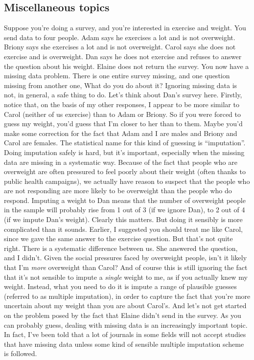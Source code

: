\subsection{Miscellaneous topics}

\begin{itemize}
 Suppose you're doing a survey, and you're interested in exercise and weight. You send data to four people. Adam says he exercises a lot and is not overweight. Briony says she exercises a lot and is not overweight. Carol says she does not exercise and is overweight. Dan says he does not exercise and refuses to answer the question about his weight. Elaine does not return the survey. You now have a missing data problem. There is one entire survey missing, and one question missing from another one, What do you do about it? Ignoring missing data is not, in general, a safe thing to do. Let's think about Dan's survey here. Firstly, notice that, on the basis of my other responses, I appear to be more similar to Carol (neither of us exercise) than to Adam or Briony. So if you were forced to guess my weight, you'd guess that I'm closer to her than to them. Maybe you'd make some correction for the fact that Adam and I are males and Briony and Carol are females. The statistical name for this kind of guessing is ``imputation''. Doing imputation safely is hard, but it's important, especially when the missing data are missing in a systematic way. Because of the fact that people who are overweight are often pressured to feel poorly about their weight (often thanks to public health campaigns), we actually have reason to suspect that the people who are not responding are more likely to be overweight than the people who do respond. Imputing a weight to Dan means that the number of overweight people in the sample will probably rise from 1 out of 3 (if we ignore Dan), to 2 out of 4 (if we impute Dan's weight). Clearly this matters. But doing it sensibly is more complicated than it sounds. Earlier, I suggested you should treat me like Carol, since we gave the same answer to the exercise question. But that's not quite right. There is a systematic difference between us. She answered the question, and I didn't. Given the social pressures faced by overweight people, isn't it likely that I'm {\it more} overweight than Carol? And of course this is still ignoring the fact that it's not sensible to impute a {\it single} weight to me, as if you actually knew my weight. Instead, what you need to do it is impute a range of plausible guesses (referred to as multiple imputation), in order to capture the fact that you're more uncertain about my weight than you are about Carol's. And let's not get started on the problem posed by the fact that Elaine didn't send in the survey. As you can probably guess, dealing with missing data is an increasingly important topic. In fact, I've been told that a lot of journals in some fields will not accept studies that have missing data unless some kind of sensible multiple imputation scheme is followed.  


\end{itemize}
